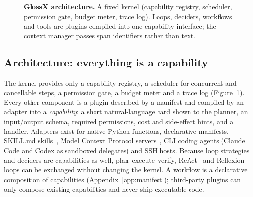 \documentclass{article}
\newcommand{\sysname}{GlossX}
\begin{document}
\begin{figure}[t]
  \centering
  \resizebox{\textwidth}{!}{}
  \caption{\textbf{\sysname{} architecture.} A fixed kernel (capability registry, scheduler, permission gate, budget meter, trace log). Loops, deciders, workflows and tools are plugins compiled into one capability interface; the context manager passes span identifiers rather than text.}
  \label{fig:arch}
\end{figure}

\subsection{Architecture: everything is a capability}
The kernel provides only a capability registry, a scheduler for concurrent and cancellable steps, a permission gate, a budget meter and a trace log (Figure~\ref{fig:arch}). Every other component is a plugin described by a manifest and compiled by an adapter into a \emph{capability}: a short natural-language card shown to the planner, an input/output schema, required permissions, cost and side-effect hints, and a handler. Adapters exist for native Python functions, declarative manifests, SKILL.md skills~\cite{agentskills2025}, Model Context Protocol servers~\cite{mcp2024}, CLI coding agents (Claude Code and Codex as sandboxed delegates) and SSH hosts. Because loop strategies and deciders are capabilities as well, plan--execute--verify, ReAct~\cite{yao2023react} and Reflexion~\cite{shinn2023reflexion} loops can be exchanged without changing the kernel. A workflow is a declarative composition of capabilities (Appendix~\ref{app:manifest}); third-party plugins can only compose existing capabilities and never ship executable code.
\end{document}
